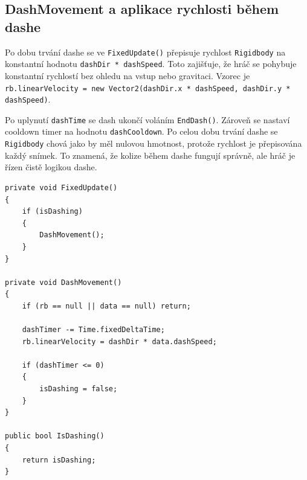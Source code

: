 \subsection{DashMovement a aplikace rychlosti během dashe}

Po dobu trvání dashe se ve \texttt{FixedUpdate()} přepisuje rychlost \texttt{Rigidbody} na konstantní hodnotu \texttt{dashDir * dashSpeed}. Toto zajišťuje, že hráč se pohybuje konstantní rychlostí bez ohledu na vstup nebo gravitaci. Vzorec je \texttt{rb.linearVelocity = new Vector2(dashDir.x * dashSpeed, dashDir.y * dashSpeed)}.

Po uplynutí \texttt{dashTime} se dash ukončí voláním \texttt{EndDash()}. Zároveň se nastaví cooldown timer na hodnotu \texttt{dashCooldown}. Po celou dobu trvání dashe se \texttt{Rigidbody} chová jako by měl nulovou hmotnost, protože rychlost je přepisována každý snímek. To znamená, že kolize během dashe fungují správně, ale hráč je řízen čistě logikou dashe.

\begin{lstlisting}[language=CSharp,caption={Listing 10: Metoda DashMovement}]
private void FixedUpdate()
{
    if (isDashing)
    {
        DashMovement();
    }
}

private void DashMovement()
{
    if (rb == null || data == null) return;

    dashTimer -= Time.fixedDeltaTime;
    rb.linearVelocity = dashDir * data.dashSpeed;

    if (dashTimer <= 0)
    {
        isDashing = false;
    }
}

public bool IsDashing()
{
    return isDashing;
}
\end{lstlisting}